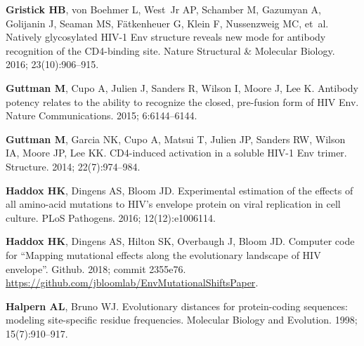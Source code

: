 \documentclass[9pt]{elife}
\begin{document}
\begin{thebibliography}{114}
\textbf{\color{eLifeMediumGrey} Gristick HB}, von Boehmer L, West~Jr AP,
  Schamber M, Gazumyan A, Golijanin J, Seaman MS, F{\"a}tkenheuer G, Klein F,
  Nussenzweig MC, et~al.
\newblock Natively glycosylated HIV-1 Env structure reveals new mode for
  antibody recognition of the CD4-binding site.
\newblock Nature Structural \& Molecular Biology.  2016; 23(10):906--915.

\textbf{\color{eLifeMediumGrey} Guttman M}, Cupo A, Julien J, Sanders R, Wilson
  I, Moore J, Lee K.
\newblock Antibody potency relates to the ability to recognize the closed,
  pre-fusion form of {HIV Env}.
\newblock Nature Communications.  2015; 6:6144--6144.

\textbf{\color{eLifeMediumGrey} Guttman M}, Garcia NK, Cupo A, Matsui T, Julien
  JP, Sanders RW, Wilson IA, Moore JP, Lee KK.
\newblock CD4-induced activation in a soluble HIV-1 Env trimer.
\newblock Structure.  2014; 22(7):974--984.

\textbf{\color{eLifeMediumGrey} Haddox HK}, Dingens AS, Bloom JD.
\newblock Experimental estimation of the effects of all amino-acid mutations to
  {HIV's} envelope protein on viral replication in cell culture.
\newblock PLoS Pathogens.  2016; 12(12):e1006114.

\textbf{\color{eLifeMediumGrey} Haddox HK}, Dingens AS, Hilton SK, Overbaugh J,
  Bloom JD.
\newblock Computer code for ``Mapping mutational effects along the evolutionary
  landscape of HIV envelope''.
\newblock Github.  2018; commit 2355e76.
\newblock
  \urlprefix\url{https://github.com/jbloomlab/EnvMutationalShiftsPaper}.

\textbf{\color{eLifeMediumGrey} Halpern AL}, Bruno WJ.
\newblock Evolutionary distances for protein-coding sequences: modeling
  site-specific residue frequencies.
\newblock Molecular Biology and Evolution.  1998; 15(7):910--917.


\end{thebibliography}
\end{document}
